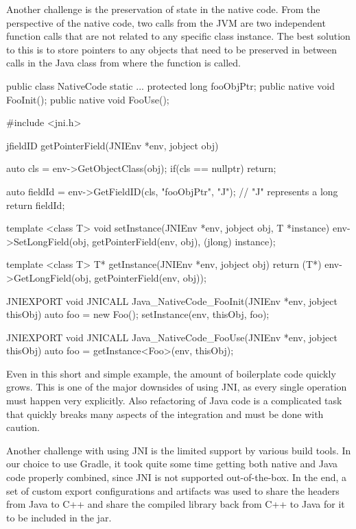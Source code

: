 Another challenge is the preservation of state in the native code. From the perspective of the native code, two calls from the JVM are two independent function calls that are not related to any specific class instance. The best solution to this is to store pointers to any objects that need to be preserved in between calls in the Java class from where the function is called.
\begin{javalong}
public class NativeCode {
    static {...}
    protected long fooObjPtr;
    public native void FooInit();
    public native void FooUse();
}
\end{javalong}
\begin{cpplong}
#include <jni.h>

jfieldID getPointerField(JNIEnv *env, jobject obj) {
    auto cls = env->GetObjectClass(obj);
    if(cls == nullptr) return;
    
    auto fieldId = env->GetFieldID(cls, "fooObjPtr", "J"); // "J" represents a long
    return fieldId;
}

template <class T> void setInstance(JNIEnv *env, jobject obj, T *instance) {
    env->SetLongField(obj, getPointerField(env, obj), (jlong) instance);
}

template <class T> T* getInstance(JNIEnv *env, jobject obj) {
    return (T*) env->GetLongField(obj, getPointerField(env, obj));
}

JNIEXPORT void JNICALL Java_NativeCode_FooInit(JNIEnv *env, jobject thisObj) {
    auto foo = new Foo();
    setInstance(env, thisObj, foo);
}

JNIEXPORT void JNICALL Java_NativeCode_FooUse(JNIEnv *env, jobject thisObj) {
    auto foo = getInstance<Foo>(env, thisObj);
}
\end{cpplong}

Even in this short and simple example, the amount of boilerplate code quickly grows. This is one of the major downsides of using JNI, as every single operation must happen very explicitly. Also refactoring of Java code is a complicated task that quickly breaks many aspects of the integration and must be done with caution.

Another challenge with using JNI is the limited support by various build tools. In our choice to use Gradle, it took quite some time getting both native and Java code properly combined, since JNI is not supported out-of-the-box. In the end, a set of custom export configurations and artifacts was used to share the headers from Java to C++ and share the compiled library back from C++ to Java for it to be included in the jar.

